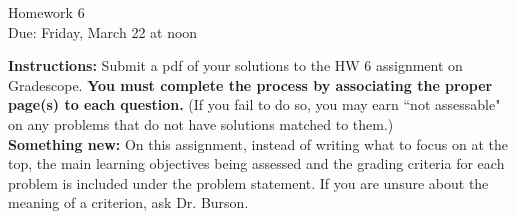 \documentclass[12pt]{article}
\begin{document}
\begin{center}
{\Large Homework 6}\\
Due: Friday,  March 22 at noon\\


\end{center}
{\bf Instructions:} Submit a pdf of your solutions to the HW 6 assignment on Gradescope.  {\bf You must complete the process by associating the proper page(s) to each question.} (If you fail to do so, you may earn ``not assessable" on any problems that do not have solutions matched to them.)\\[3pt]

{\bf Something new:} On this assignment, instead of writing what to focus on at the top, the main learning objectives being assessed and the grading criteria for each problem is included under the problem statement.  If you are unsure about the meaning of a criterion, ask Dr. Burson.  
\end{document}
